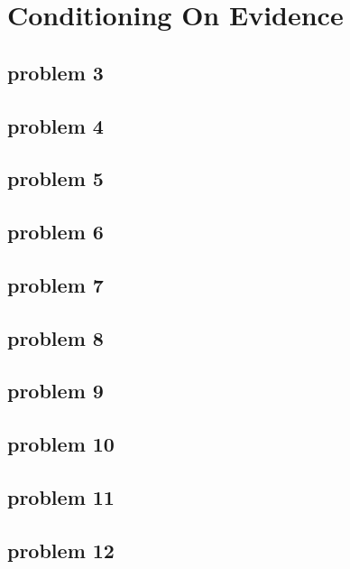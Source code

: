 \section{Conditioning On Evidence}

\subsection{problem 3}


\subsection{problem 4}


\subsection{problem 5}


\subsection{problem 6}


\subsection{problem 7}


\subsection{problem 8}


\subsection{problem 9}


\subsection{problem 10}


\subsection{problem 11}


\subsection{problem 12}
